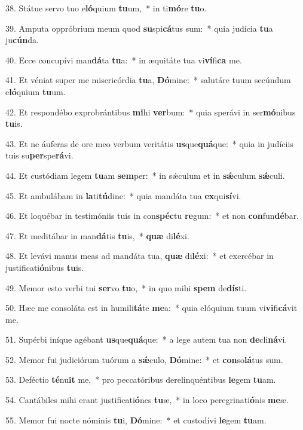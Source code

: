 38. Státue servo tuo e\textbf{ló}quium \textbf{tu}um,~*  in ti\textbf{mó}re \textbf{tu}o.\

39. Amputa oppróbrium meum quod \textbf{su}spi\textbf{cá}tus sum:~*  quia judícia \textbf{tu}a ju\textbf{cún}da.\

40. Ecce concupívi man\textbf{dá}ta \textbf{tu}a:~*  in æquitáte tua vi\textbf{ví}fi\textbf{ca} me.\

41. Et véniat super me misericórdia \textbf{tu}a, \textbf{Dó}mine:~*  salutáre tuum secúndum e\textbf{ló}quium \textbf{tu}um.\

42. Et respondébo exprobrántibus \textbf{mi}hi \textbf{ver}bum:~*  quia sperávi in ser\textbf{mó}nibus \textbf{tu}is.\

43. Et ne áuferas de ore meo verbum veritátis \textbf{us}que\textbf{quá}que:~*  quia in judíciis tuis su\textbf{per}spe\textbf{rá}vi.\

44. Et custódiam legem \textbf{tu}am \textbf{sem}per:~*  in sǽculum et in \textbf{sǽ}culum \textbf{sǽ}culi.\

45. Et ambulábam in \textbf{la}ti\textbf{tú}dine:~*  quia mandáta tua \textbf{ex}qui\textbf{sí}vi.\

46. Et loquébar in testimóniis tuis in con\textbf{spéc}tu \textbf{re}gum:~*  et non \textbf{con}fun\textbf{dé}bar.\

47. Et meditábar in man\textbf{dá}tis \textbf{tu}is,~*  \textbf{quæ} di\textbf{lé}xi.\

48. Et levávi manus meas ad mandáta tua, \textbf{quæ} di\textbf{lé}xi:~*  et exercébar in justificati\textbf{ó}nibus \textbf{tu}is.\

49. Memor esto verbi tui \textbf{ser}vo \textbf{tu}o,~*  in quo mihi \textbf{spem} de\textbf{dís}ti.\

50. Hæc me consoláta est in humili\textbf{tá}te \textbf{me}a:~*  quia elóquium tuum vi\textbf{vi}fi\textbf{cá}vit me.\

51. Supérbi iníque agébant \textbf{us}que\textbf{quá}que:~*  a lege autem tua non \textbf{de}cli\textbf{ná}vi.\

52. Memor fui judiciórum tuórum a \textbf{sǽ}culo, \textbf{Dó}mine:~*  et \textbf{con}so\textbf{lá}tus sum.\

53. Deféctio \textbf{té}nu\textbf{it} me,~*  pro peccatóribus derelinquéntibus \textbf{le}gem \textbf{tu}am.\

54. Cantábiles mihi erant justificati\textbf{ó}nes \textbf{tu}æ,~*  in loco peregrinati\textbf{ó}nis \textbf{me}æ.\

55. Memor fui nocte nóminis \textbf{tu}i, \textbf{Dó}mine:~*  et custodívi \textbf{le}gem \textbf{tu}am.\

